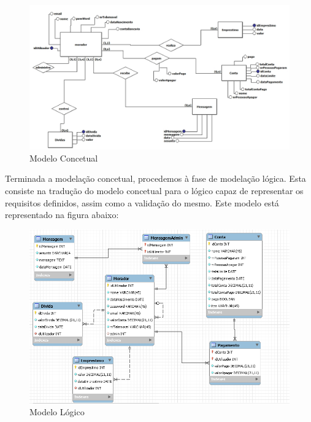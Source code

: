 \begin{figure}[htb!]
	\includegraphics[scale=0.6]{imagens/bd/modeloconcetual}  
	\caption{Modelo Concetual}  
\end{figure}

\newpage

Terminada a modelação concetual, procedemos à fase de modelação lógica. Esta consiste na tradução do modelo concetual para o lógico capaz de representar os requisitos definidos, assim como a validação do mesmo. Este modelo está representado na figura abaixo: 

\begin{figure}[htb!]
	\includegraphics[scale=0.7]{imagens/bd/modelologico}  
	\caption{Modelo Lógico}  
\end{figure}

\newpage

